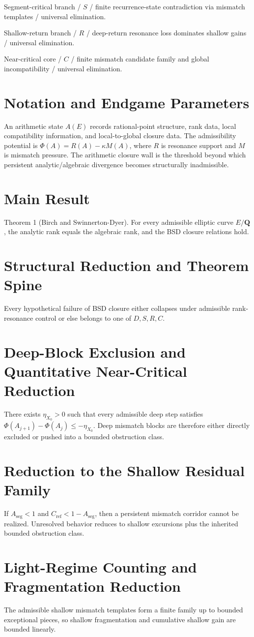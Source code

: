 \documentclass[11pt]{article}
\theoremstyle{definition}
\begin{document}
Segment-critical branch / $S$ / finite recurrence-state contradiction via mismatch templates / universal elimination.

Shallow-return branch / $R$ / deep-return resonance loss dominates shallow gains / universal elimination.

Near-critical core / $C$ / finite mismatch candidate family and global incompatibility / universal elimination.
\section{Notation and Endgame Parameters}
An arithmetic state $A(E)$ records rational-point structure, rank data, local compatibility information, and local-to-global closure data. The admissibility potential is $\Phi(A)=R(A)-\kappa M(A)$, where $R$ is resonance support and $M$ is mismatch pressure. The arithmetic closure wall is the threshold beyond which persistent analytic/algebraic divergence becomes structurally inadmissible.
\section{Main Result}
Theorem 1 (Birch and Swinnerton-Dyer). For every admissible elliptic curve $E/\mathbf Q$, the analytic rank equals the algebraic rank, and the BSD closure relations hold.
\section{Structural Reduction and Theorem Spine}
Every hypothetical failure of BSD closure either collapses under admissible rank-resonance control or else belongs to one of $D,S,R,C$.
\section{Deep-Block Exclusion and Quantitative Near-Critical Reduction}
There exists $\eta_{X_0}>0$ such that every admissible deep step satisfies $\Phi(A_{j+1})-\Phi(A_j)\le -\eta_{X_0}$. Deep mismatch blocks are therefore either directly excluded or pushed into a bounded obstruction class.
\section{Reduction to the Shallow Residual Family}
If $A_{\mathrm{seg}}<1$ and $C_{\mathrm{ref}}<1-A_{\mathrm{seg}}$, then a persistent mismatch corridor cannot be realized. Unresolved behavior reduces to shallow excursions plus the inherited bounded obstruction class.
\section{Light-Regime Counting and Fragmentation Reduction}
The admissible shallow mismatch templates form a finite family up to bounded exceptional pieces, so shallow fragmentation and cumulative shallow gain are bounded linearly.
\end{document}
